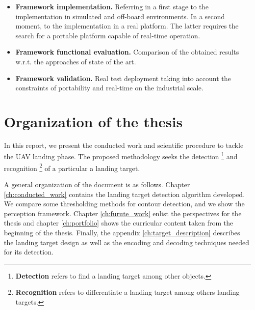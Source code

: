 \begin{itemize}
 \item \textbf{Framework implementation.} Referring in a first stage to the implementation in simulated and off-board environments. In a second moment, to the implementation in a real platform. The latter requires the search for a portable platform capable of real-time operation.
 
 \item \textbf{Framework functional evaluation.} Comparison of the obtained results w.r.t. the approaches of state of the art.
 
 \item \textbf{Framework validation.} Real test deployment taking into account the constraints of portability and real-time on the industrial scale.
 
\end{itemize}

\section{Organization of the thesis}
In this report, we present the conducted work and scientific procedure to tackle the UAV landing phase. The proposed methodology seeks the detection \footnote{\textbf{Detection} refers to find a landing target among other objects.} and recognition \footnote{\textbf{Recognition} refers to differentiate a landing target among others landing targets.} of a particular a landing target. 

A general organization of the document is as follows. Chapter \ref{ch:conducted_work} contains the landing target detection algorithm developed. We compare some thresholding methods for contour detection, and we show the perception framework. Chapter \ref{ch:furute_work} enlist the perspectives for the thesis and chapter \ref{ch:portfolio} shows the curricular content taken from the beginning of the thesis. Finally, the appendix \ref{ch:target_description} describes the landing target design as well as the encoding and decoding techniques needed for its detection.





